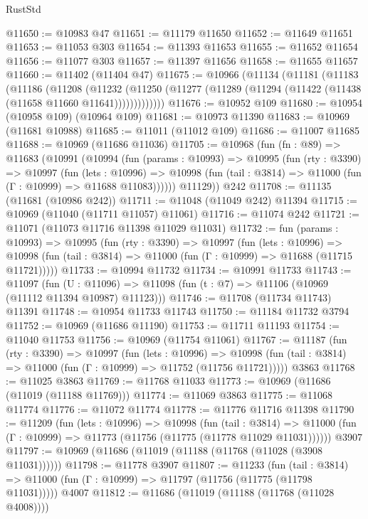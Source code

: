 \begin{lexlean}{RustStd}
\begin{coremodule}
@11650 := @10983 @47
@11651 := @11179 @11650
@11652 := @11649 @11651
@11653 := @11053 @303
@11654 := @11393 @11653
@11655 := @11652 @11654
@11656 := @11077 @303
@11657 := @11397 @11656
@11658 := @11655 @11657
@11660 := @11402 (@11404 @47)
@11675 := @10966
    (@11134
      (@11181
        (@11183
          (@11186
            (@11208
              (@11232
                (@11250 (@11277 (@11289 (@11294 (@11422 (@11438 (@11658 @11660 @11641)))))))))))))
@11676 := @10952 @109
@11680 := @10954 (@10958 @109) (@10964 @109)
@11681 := @10973 @11390
@11683 := @10969 (@11681 @10988)
@11685 := @11011 (@11012 @109)
@11686 := @11007 @11685
@11688 := @10969 (@11686 @11036)
@11705 := @10968
    (fun (fn : @89) =>
    @11683
      (@10991
        (@10994
          (fun (params : @10993) =>
          @10995
            (fun (rty : @3390) =>
            @10997
              (fun (lets : @10996) =>
              @10998 (fun (tail : @3814) => @11000 (fun (Γ : @10999) => @11688 @11083))))))
        @11129))
    @242
@11708 := @11135 (@11681 (@10986 @242))
@11711 := @11048 (@11049 @242) @11394
@11715 := @10969 (@11040 (@11711 @11057) @11061)
@11716 := @11074 @242
@11721 := @11071 (@11073 @11716 @11398 @11029 @11031)
@11732 := fun (params : @10993) =>
  @10995
    (fun (rty : @3390) =>
    @10997
      (fun (lets : @10996) =>
      @10998 (fun (tail : @3814) => @11000 (fun (Γ : @10999) => @11688 (@11715 @11721)))))
@11733 := @10994 @11732
@11734 := @10991 @11733
@11743 := @11097
    (fun (U : @11096) => @11098 (fun (t : @7) => @11106 (@10969 (@11112 @11394 @10987) @11123)))
@11746 := @11708 (@11734 @11743) @11391
@11748 := @10954 @11733 @11743
@11750 := @11184 @11732 @3794
@11752 := @10969 (@11686 @11190)
@11753 := @11711 @11193
@11754 := @11040 @11753
@11756 := @10969 (@11754 @11061)
@11767 := @11187
    (fun (rty : @3390) =>
    @10997
      (fun (lets : @10996) =>
      @10998 (fun (tail : @3814) => @11000 (fun (Γ : @10999) => @11752 (@11756 @11721)))))
    @3863
@11768 := @11025 @3863
@11769 := @11768 @11033
@11773 := @10969 (@11686 (@11019 (@11188 @11769)))
@11774 := @11069 @3863
@11775 := @11068 @11774
@11776 := @11072 @11774
@11778 := @11776 @11716 @11398
@11790 := @11209
    (fun (lets : @10996) =>
    @10998
      (fun (tail : @3814) =>
      @11000 (fun (Γ : @10999) => @11773 (@11756 (@11775 (@11778 @11029 @11031))))))
    @3907
@11797 := @10969 (@11686 (@11019 (@11188 (@11768 (@11028 (@3908 @11031))))))
@11798 := @11778 @3907
@11807 := @11233
    (fun (tail : @3814) => @11000 (fun (Γ : @10999) => @11797 (@11756 (@11775 (@11798 @11031)))))
    @4007
@11812 := @11686 (@11019 (@11188 (@11768 (@11028 @4008))))

\end{coremodule}
\end{lexlean}

